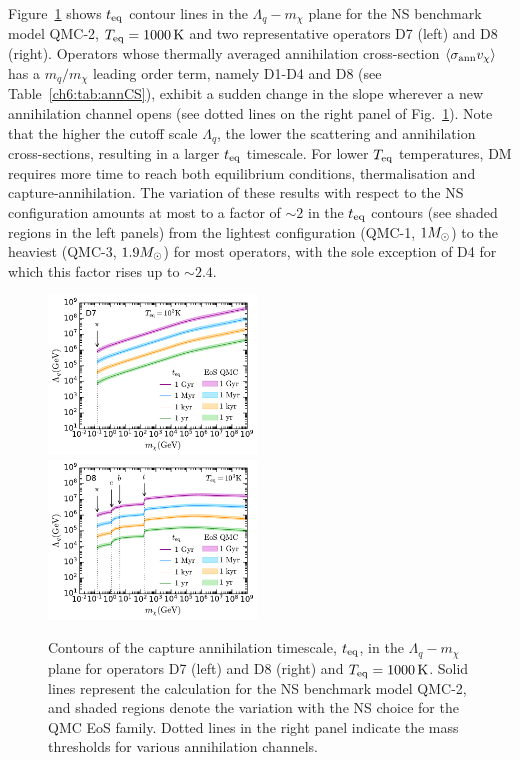 Figure~\ref{app:fig:ann_xs_plots} shows $t_{\rm eq}$ contour lines in the $\Lambda_q-m_\chi$ plane for the NS benchmark model QMC-2, $\Tstareq=1000\K$ and two representative operators D7 (left) and D8 (right). 
Operators whose thermally averaged annihilation cross-section $\langle \sigma_{\rm ann} v_\chi \rangle$ has a  $m_q/m_\chi$ leading order term, namely D1-D4 and D8 (see Table~\ref{ch6:tab:annCS}), exhibit a sudden change in the slope wherever a new annihilation channel opens (see dotted lines on the right panel of Fig.~\ref{app:fig:ann_xs_plots}). Note that the higher the cutoff scale $\Lambda_q$, the lower the scattering and annihilation cross-sections, resulting in a larger $t_{\rm eq}$ timescale. For lower $T_{\rm eq}$ temperatures, DM requires more time to reach both equilibrium conditions, thermalisation and capture-annihilation. The variation of these results with respect to the NS configuration amounts at most to a factor of $\sim2$ in the $t_{\rm eq}$ contours (see shaded regions in the left panels) from the lightest configuration (QMC-1, $1M_\odot$) to the heaviest (QMC-3, $1.9M_\odot$) for most operators, with the sole exception of D4 for which this factor rises up to $\sim 2.4$. 

\begin{figure}
    \centering
    \includegraphics[width = 0.496\textwidth]{img/thermalisation/D7_Lambda_mdm_teq.pdf}
    \includegraphics[width = 0.496\textwidth]{img/thermalisation/D8_Lambda_mdm_teq.pdf}    
    \caption[Contours of the capture annihilation timescale, $t_{\rm eq}$,  in the $\Lambda_q-m_\chi$ plane for operators D7 (left) and D8 (right) and $\Tstareq=1000\K$. ]{
    Contours of the capture annihilation timescale, $t_{\rm eq}$,  in the $\Lambda_q-m_\chi$ plane for operators D7 (left) and D8 (right) and $\Tstareq=1000\K$. 
    Solid lines represent the calculation for the NS benchmark model QMC-2, and shaded regions denote the variation with the NS choice for the QMC EoS family. 
    Dotted lines in the right panel indicate the mass thresholds for various annihilation channels.  
    }
    \label{app:fig:ann_xs_plots}
\end{figure}


